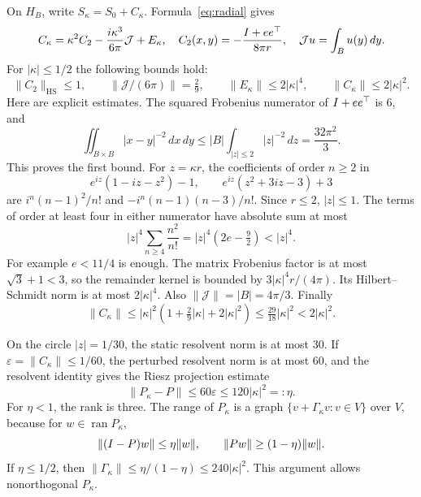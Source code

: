 \documentclass[11pt]{article}
\theoremstyle{remark}\newtheorem{remark}[theorem]{Remark}
\newcommand{\ran}{\operatorname{ran}}\newcommand{\tr}{\operatorname{tr}}
\newcommand{\HS}{\mathrm{HS}}\newcommand{\lat}{\mathrm{lat}}
\begin{document}
On $H_B$, write $S_\kappa=S_0+C_\kappa$. Formula~\eqref{eq:radial} gives
\begin{equation}\label{eq:ball-expansion}
 C_\kappa=\kappa^2C_2-\frac{i\kappa^3}{6\pi}\mathcal J+E_\kappa,
 \quad C_2(x,y)=-\frac{I+ee^\top}{8\pi r},
 \quad \mathcal Ju=\int_Bu(y)\,dy.
\end{equation}
For $|\kappa|\le1/2$ the following bounds hold:
\begin{equation}\label{eq:ball-bounds}
 \|C_2\|_\HS\le1,\qquad
 \|\mathcal J/(6\pi)\|=\tfrac29,\qquad
 \|E_\kappa\|\le2|\kappa|^4,\qquad
 \|C_\kappa\|\le2|\kappa|^2.
\end{equation}
Here are explicit estimates. The squared Frobenius numerator of $I+ee^\top$ is $6$, and
\[
 \iint_{B\times B}|x-y|^{-2}\,dx\,dy
 \le |B|\int_{|z|\le2}|z|^{-2}\,dz=\frac{32\pi^2}{3}.
\]
This proves the first bound. For $z=\kappa r$, the coefficients of order $n\ge2$ in
\[
 e^{iz}(1-iz-z^2)-1,\qquad e^{iz}(z^2+3iz-3)+3
\]
are $i^n(n-1)^2/n!$ and $-i^n(n-1)(n-3)/n!$. Since $r\le2$, $|z|\le1$. The terms of order at least four in either numerator have absolute sum at most
\[
 |z|^4\sum_{n\ge4}\frac{n^2}{n!}
     =|z|^4(2e-\tfrac92)<|z|^4.
\]
For example $e<11/4$ is enough. The matrix Frobenius factor is at most $\sqrt3+1<3$, so the remainder kernel is bounded by $3|\kappa|^4r/(4\pi)$. Its Hilbert--Schmidt norm is at most $2|\kappa|^4$. Also $\|\mathcal J\|=|B|=4\pi/3$. Finally
\[
 \|C_\kappa\|\le|\kappa|^2(1+\tfrac29|\kappa|+2|\kappa|^2)
                    \le\tfrac{29}{18}|\kappa|^2<2|\kappa|^2.
\]

On the circle $|z|=1/30$, the static resolvent norm is at most $30$. If $\varepsilon=\|C_\kappa\|\le1/60$, the perturbed resolvent norm is at most $60$, and the resolvent identity gives the Riesz projection estimate
\begin{equation}\label{eq:projection-ball}
 \|P_\kappa-P\|\le60\varepsilon\le120|\kappa|^2=:\eta.
\end{equation}
For $\eta<1$, the rank is three. The range of $P_\kappa$ is a graph $\{v+\Gamma_\kappa v:v\in V\}$ over $V$, because for $w\in\ran P_\kappa$,
\[
 \|(I-P)w\|\le\eta\|w\|,\qquad \|Pw\|\ge(1-\eta)\|w\|.
\]
If $\eta\le1/2$, then $\|\Gamma_\kappa\|\le\eta/(1-\eta)\le240|\kappa|^2$. This argument allows nonorthogonal $P_\kappa$.
\end{document}
